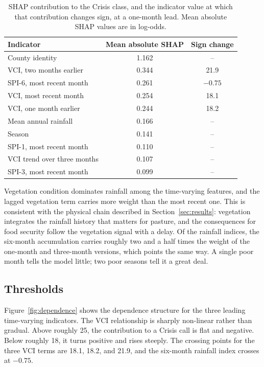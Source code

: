 \documentclass[11pt]{article}
\begin{document}
\begin{table}[h]
\centering
\caption{SHAP contribution to the Crisis class, and the indicator value at which
that contribution changes sign, at a one-month lead. Mean absolute SHAP values
are in log-odds.}
\label{tab:shap}
\small
\begin{tabular}{lcc}
\toprule
Indicator & Mean absolute SHAP & Sign change \\
\midrule
County identity                      & 1.162 & -- \\
VCI, two months earlier              & 0.344 & 21.9 \\
SPI-6, most recent month             & 0.261 & $-0.75$ \\
VCI, most recent month               & 0.254 & 18.1 \\
VCI, one month earlier               & 0.244 & 18.2 \\
Mean annual rainfall                 & 0.166 & -- \\
Season                               & 0.141 & -- \\
SPI-1, most recent month             & 0.110 & -- \\
VCI trend over three months          & 0.107 & -- \\
SPI-3, most recent month             & 0.099 & -- \\
\bottomrule
\end{tabular}
\end{table}

Vegetation condition dominates rainfall among the time-varying features, and the
lagged vegetation term carries more weight than the most recent one. This is
consistent with the physical chain described in Section~\ref{sec:results}:
vegetation integrates the rainfall history that matters for pasture, and the
consequences for food security follow the vegetation signal with a delay. Of the
rainfall indices, the six-month accumulation carries roughly two and a half times
the weight of the one-month and three-month versions, which points the same way.
A single poor month tells the model little; two poor seasons tell it a great
deal.

\subsection{Thresholds}

Figure~\ref{fig:dependence} shows the dependence structure for the three leading
time-varying indicators. The VCI relationship is sharply non-linear rather than
gradual. Above roughly 25, the contribution to a Crisis call is flat and
negative. Below roughly 18, it turns positive and rises steeply. The crossing
points for the three VCI terms are 18.1, 18.2, and 21.9, and the six-month
rainfall index crosses at $-0.75$.
\end{document}
